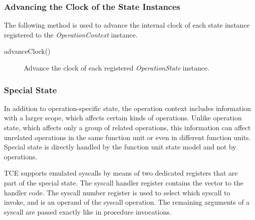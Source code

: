 \documentclass[a4paper,twoside]{tce}
\begin{document}
\subsubsection{Advancing the Clock of the State Instances}

The following method is used to advance the internal clock of each state
instance registered to the \emph{OperationContext} instance.

\begin{description}
\item[advanceClock()] %
  Advance the clock of each registered \emph{OperationState} instance.
\end{description}

\subsubsection{Special State}
In addition to operation-specific state, the operation context includes
information with a larger scope, which affects certain kinds of operations.
Unlike operation state, which affects only a group of related operations,
this information can affect unrelated operations in the same function unit
or even in different function units. Special state is directly handled by
the function unit state model and not by operations.

TCE supports emulated syscalls by means of two dedicated registers that are
part of the special state. The syscall handler register contains the vector
to the handler code. The syscall number register is used to select which
syscall to invoke, and is an operand of the syscall operation. The remaining
arguments of a syscall are passed exactly like in procedure invocations.
\end{document}
